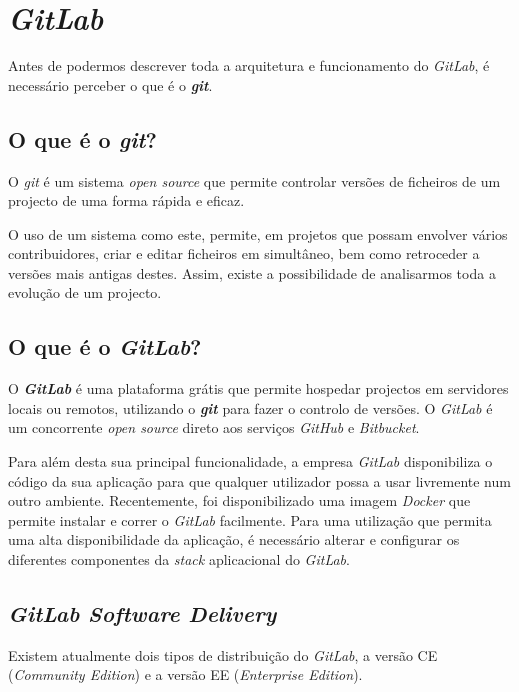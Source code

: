 \documentclass[12pt,a4paper]{article}
\begin{document}
\newpage
\section{\emph{GitLab}}
Antes de podermos descrever toda a arquitetura e funcionamento do \emph{GitLab}, é necessário perceber o que é o \emph{\textbf{git}}.

\subsection{O que é o \emph{git}?}
O \emph{git} é um sistema \emph{open source} que permite controlar versões de ficheiros de um projecto de uma forma rápida e eficaz.

O uso de um sistema como este, permite, em projetos que possam envolver vários contribuidores, criar e editar ficheiros em simultâneo, bem como retroceder a versões mais antigas destes. Assim, existe a possibilidade de analisarmos toda a evolução de um projecto.

\subsection{O que é o \emph{GitLab}?}
O \textbf{\emph{GitLab}} é uma plataforma grátis que permite hospedar projectos em servidores locais ou remotos, utilizando o \textbf{\emph{git}} para fazer o controlo de versões. O \emph{GitLab} é um concorrente \emph{open source} direto aos serviços \emph{GitHub} e \emph{Bitbucket}.

Para além desta sua principal funcionalidade, a empresa \emph{GitLab} disponibiliza o código da sua aplicação para que qualquer utilizador possa a usar livremente num outro ambiente. Recentemente, foi disponibilizado uma imagem \emph{Docker} que permite instalar e correr o \emph{GitLab} facilmente. Para uma utilização que permita uma alta disponibilidade da aplicação, é necessário alterar e configurar os diferentes componentes da \emph{stack} aplicacional do \emph{GitLab}.

\subsection{\emph{GitLab Software Delivery}}
Existem atualmente dois tipos de distribuição do \emph{GitLab}, a versão CE (\emph{Community Edition}) e a versão EE (\emph{Enterprise Edition}).
\end{document}
